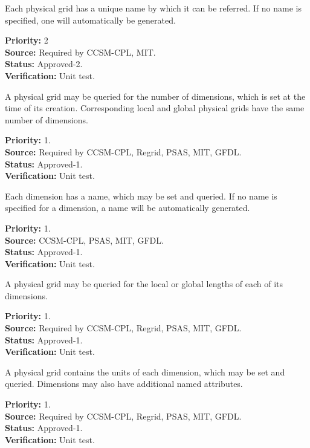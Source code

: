 
Each physical grid has a unique name by which it can be referred.  If no name is
specified, one will automatically be generated.
\begin{reqlist}
{\bf Priority:} 2 \\
{\bf Source:} Required by CCSM-CPL, MIT. \\
{\bf Status:} Approved-2. \\
{\bf Verification:} Unit test.
\end{reqlist}

A physical grid may be queried for the number of dimensions, which is
set at the time of its creation.  Corresponding local and global physical grids have
the same number of dimensions.
\begin{reqlist}
{\bf Priority:} 1. \\
{\bf Source:} Required by CCSM-CPL, Regrid, PSAS, MIT, GFDL.  \\
{\bf Status:} Approved-1. \\
{\bf Verification:} Unit test.
\end{reqlist}

Each dimension has a name, which may be set and queried.  If no name is specified
for a dimension, a name will be automatically generated.
\begin{reqlist}
{\bf Priority:} 1. \\
{\bf Source:} CCSM-CPL, PSAS, MIT, GFDL. \\
{\bf Status:} Approved-1. \\
{\bf Verification:} Unit test.
\end{reqlist}

A physical grid may be queried for the local or global lengths of each of its dimensions.
\begin{reqlist}
{\bf Priority:} 1. \\
{\bf Source:} Required by CCSM-CPL, Regrid, PSAS, MIT, GFDL. \\
{\bf Status:} Approved-1. \\
{\bf Verification:} Unit test.
\end{reqlist}

A physical grid contains the units of each dimension, which may be set and queried. 
Dimensions may also have additional named attributes.
\begin{reqlist}
{\bf Priority:} 1. \\
{\bf Source:} Required by CCSM-CPL, Regrid, PSAS, MIT, GFDL.  \\
{\bf Status:} Approved-1. \\
{\bf Verification:} Unit test. 
\end{reqlist}

